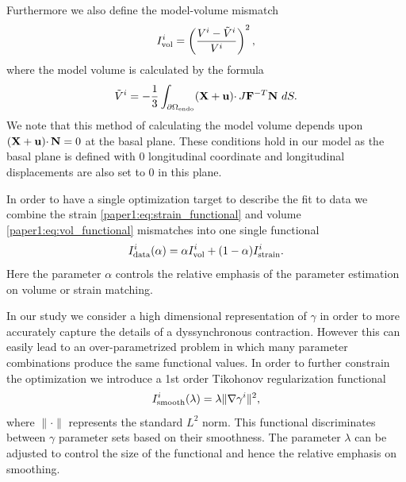 Furthermore we also define the model-volume mismatch
\begin{equation}
  I_{\text{vol}}^i  =  \left( \frac{V^i - \tilde{V}^i}{V^i} \right)^2,
\end{equation}
where the model volume is calculated by the formula
\begin{equation}
  \tilde{V}^i = -\frac{1}{3} \int_{\partial \Omega_{ \textnormal{\tiny \text{endo}}}} (\mathbf{X} + \mathbf{u}) \cdotp J \mathbf{F}^{-T} \mathbf{N}  \ dS.
  \label{paper1:eq:vol_functional}
 \end{equation}
We note that this method of calculating the model volume depends upon
$(\mathbf{X} + \mathbf{u})\cdotp \mathbf{N} = 0$ at the basal plane. These conditions hold in 
our model as the basal plane is defined with 0 longitudinal coordinate and 
longitudinal displacements are also set to 0 in this plane.

In order to have a single optimization target to describe the fit to data 
we combine the strain \eqref{paper1:eq:strain_functional} and volume
\eqref{paper1:eq:vol_functional} mismatches into one single functional
\begin{equation}
  I_{\text{data}}^i(\alpha) = \alpha I_{\text{vol}}^i + (1 - \alpha) I_{\text{strain}}^i.
\label{paper1:eq:total_functional}
\end{equation}
Here the parameter $\alpha$ controls the relative emphasis of the parameter
estimation on volume or strain matching.

In our study we consider a high dimensional representation of $\gamma$ in order
to more accurately capture the details of a dyssynchronous contraction. However this can easily lead to
an over-parametrized problem in which many parameter combinations produce the same
functional values. In order to further constrain the optimization we introduce
a 1st order Tikohonov regularization functional
\begin{equation}
 I_{\text{smooth}}^i(\lambda) = \lambda \| \nabla \gamma^i \|^2, 
 \label{paper1:eq:I_smooth}
\end{equation}
where $\|\cdotp \|$ represents the standard $L^2$ norm.
This functional discriminates between $\gamma$ parameter sets based on their smoothness.
The parameter $\lambda$ can be adjusted to control the size of the functional and hence
the relative emphasis on smoothing.

